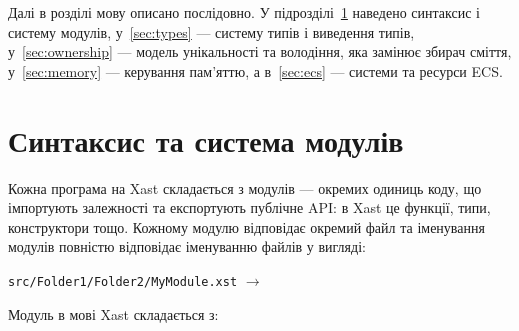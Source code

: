 Далі в розділі мову описано послідовно. У підрозділі~\ref{sec:syntax} наведено синтаксис і систему модулів, у~\ref{sec:types} --- систему типів і виведення типів, у~\ref{sec:ownership} --- модель унікальності та володіння, яка замінює збирач сміття, у~\ref{sec:memory} --- керування пам'яттю, а в~\ref{sec:ecs} --- системи та ресурси ECS.

\section{Синтаксис та система модулів}
\label{sec:syntax}

Кожна програма на Xast складається з модулів --- окремих одиниць коду, що імпортують залежності та експортують публічне API: в Xast це функції, типи, конструктори тощо. Кожному модулю відповідає окремий файл та іменування модулів повністю відповідає іменуванню файлів у вигляді:

\texttt{src/Folder1/Folder2/MyModule.xst} $\to$ 

Модуль в мові Xast складається з:

